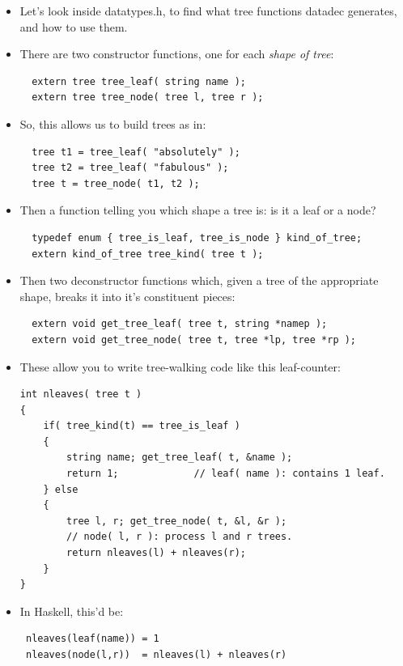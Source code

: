 \documentclass[handout,]{beamer}
\newcommand{\pitem}{\pause \item}
\begin{document}
\begin{frame}[fragile]
    \begin{itemize}
    \item
      Let's look inside \alert{datatypes.h},
      to find what \alert{tree} functions \alert{datadec} generates, and how to
      use them.
    \pitem
      There are two \alert{constructor functions}, one for each {\em shape of tree}:
\begin{verbatim}
  extern tree tree_leaf( string name );
  extern tree tree_node( tree l, tree r );
\end{verbatim}

    \pitem
      So, this allows us to build trees as in:
\begin{verbatim}
  tree t1 = tree_leaf( "absolutely" );
  tree t2 = tree_leaf( "fabulous" );
  tree t = tree_node( t1, t2 );
\end{verbatim}

    \pitem
      Then a function telling you \alert{which shape a tree is}:
      is it a leaf or a node?
\begin{verbatim}
  typedef enum { tree_is_leaf, tree_is_node } kind_of_tree;
  extern kind_of_tree tree_kind( tree t );
\end{verbatim}

    \pitem
      Then two \alert{deconstructor functions} which, given a tree of the
      appropriate shape, breaks it into it's constituent pieces:
\begin{verbatim}
  extern void get_tree_leaf( tree t, string *namep );
  extern void get_tree_node( tree t, tree *lp, tree *rp );
\end{verbatim}
\end{itemize}

\end{frame}


\begin{frame}[fragile]
    \begin{itemize}
    \item
     These allow you to write \alert{tree-walking} code like this leaf-counter:
\small
\begin{verbatim}
int nleaves( tree t )
{
    if( tree_kind(t) == tree_is_leaf )
    {
        string name; get_tree_leaf( t, &name );
        return 1;             // leaf( name ): contains 1 leaf.
    } else
    {
        tree l, r; get_tree_node( t, &l, &r );
        // node( l, r ): process l and r trees.
        return nleaves(l) + nleaves(r);
    }
}
\end{verbatim}
\small

   \item
 In Haskell, this'd be:
\begin{verbatim}
 nleaves(leaf(name)) = 1
 nleaves(node(l,r))  = nleaves(l) + nleaves(r)
\end{verbatim}

\end{itemize}
\end{frame}
\end{document}
